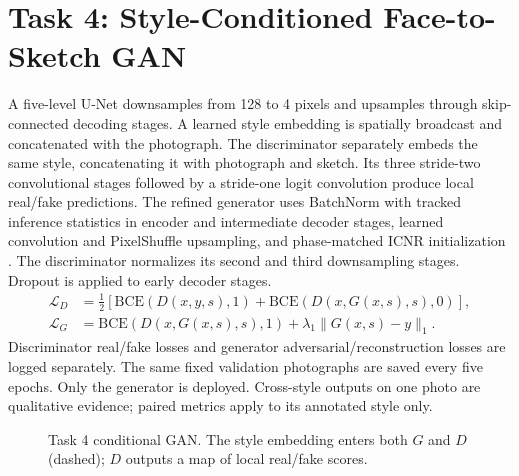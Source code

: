 \documentclass[conference]{IEEEtran}
\begin{document}
\section{Task 4: Style-Conditioned Face-to-Sketch GAN}
A five-level U-Net downsamples from 128 to 4 pixels and upsamples through
skip-connected decoding stages. A learned style embedding is spatially
broadcast and concatenated with the photograph. The discriminator separately
embeds the same style, concatenating it with photograph and sketch. Its three
stride-two convolutional stages followed by a stride-one logit convolution
produce local real/fake predictions. The refined generator uses BatchNorm with tracked inference statistics in encoder and intermediate decoder stages, learned convolution and PixelShuffle upsampling, and phase-matched ICNR initialization \cite{shi,aitken}. The discriminator normalizes its second and third downsampling stages. Dropout is applied to early decoder stages.
\begin{align}
\mathcal{L}_D&=\tfrac12[\mathrm{BCE}(D(x,y,s),1)+\mathrm{BCE}(D(x,G(x,s),s),0)],\\
\mathcal{L}_G&=\mathrm{BCE}(D(x,G(x,s),s),1)+\lambda_1\|G(x,s)-y\|_1.
\end{align}
Discriminator real/fake losses and generator adversarial/reconstruction losses
are logged separately. The same fixed validation photographs are saved every
five epochs. Only the generator is deployed. Cross-style outputs on one photo
are qualitative evidence; paired metrics apply to its annotated style only.

\begin{figure}[!ht]\centering
{}\caption{Task 4 conditional GAN. The style embedding enters both $G$ and $D$ (dashed); $D$ outputs a map of local real/fake scores.}\end{figure}
\end{document}
